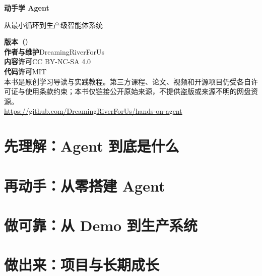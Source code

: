 \documentclass[11pt,openany,fontset=fandol]{ctexbook}
\begin{document}
\makedigitalcover

\thispagestyle{empty}
\vspace*{0.18\textheight}
{\sffamily\bfseries\fontsize{24}{30}\selectfont 动手学 Agent}\par
\vspace{0.7em}
{\sffamily\large 从最小循环到生产级智能体系统}\par
\vfill
\begin{minipage}{0.82\textwidth}
\small
\textbf{版本}\quad \BookVersion（\BookDate）\\[0.6em]
\textbf{作者与维护}\quad DreamingRiverForUs\\[0.6em]
\textbf{内容许可}\quad CC BY-NC-SA 4.0\\
\textbf{代码许可}\quad MIT\\[0.6em]
本书是原创学习导读与实践教程。第三方课程、论文、视频和开源项目仍受各自许可证与使用条款约束；本书仅链接公开原始来源，不提供盗版或来源不明的网盘资源。\\[0.8em]
\url{https://github.com/DreamingRiverForUs/hands-on-agent}
\end{minipage}
\vspace*{0.12\textheight}
\clearpage

\frontmatter

\tableofcontents

\mainmatter

\part{先理解：Agent 到底是什么}




\part{再动手：从零搭建 Agent}






\part{做可靠：从 Demo 到生产系统}





\part{做出来：项目与长期成长}



\appendix



\backmatter



\end{document}

